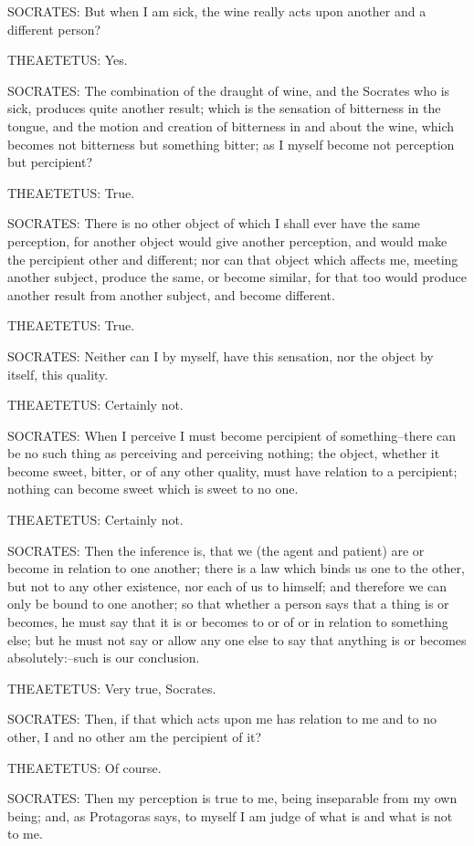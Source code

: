 SOCRATES: But when I am sick, the wine really acts upon another and a
different person?

THEAETETUS: Yes.

SOCRATES: The combination of the draught of wine, and the Socrates
who is sick, produces quite another result; which is the sensation of
bitterness in the tongue, and the motion and creation of bitterness in
and about the wine, which becomes not bitterness but something bitter;
as I myself become not perception but percipient?

THEAETETUS: True.

SOCRATES: There is no other object of which I shall ever have the same
perception, for another object would give another perception, and would
make the percipient other and different; nor can that object which
affects me, meeting another subject, produce the same, or become
similar, for that too would produce another result from another subject,
and become different.

THEAETETUS: True.

SOCRATES: Neither can I by myself, have this sensation, nor the object
by itself, this quality.

THEAETETUS: Certainly not.

SOCRATES: When I perceive I must become percipient of something--there
can be no such thing as perceiving and perceiving nothing; the object,
whether it become sweet, bitter, or of any other quality, must have
relation to a percipient; nothing can become sweet which is sweet to no
one.

THEAETETUS: Certainly not.

SOCRATES: Then the inference is, that we (the agent and patient) are or
become in relation to one another; there is a law which binds us one to
the other, but not to any other existence, nor each of us to himself;
and therefore we can only be bound to one another; so that whether
a person says that a thing is or becomes, he must say that it is or
becomes to or of or in relation to something else; but he must not
say or allow any one else to say that anything is or becomes
absolutely:--such is our conclusion.

THEAETETUS: Very true, Socrates.

SOCRATES: Then, if that which acts upon me has relation to me and to no
other, I and no other am the percipient of it?

THEAETETUS: Of course.

SOCRATES: Then my perception is true to me, being inseparable from my
own being; and, as Protagoras says, to myself I am judge of what is and
what is not to me.

